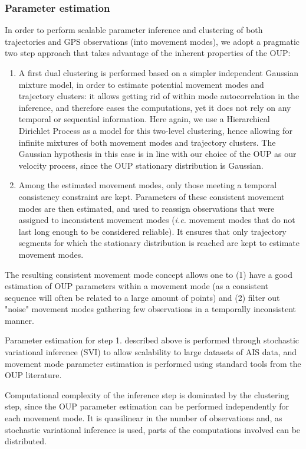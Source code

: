 \subsubsection{Parameter estimation}

In order to perform scalable parameter inference and clustering of both
trajectories and GPS observations (into movement modes), we adopt a pragmatic
two step approach that takes advantage of the inherent properties of the OUP:

\begin{enumerate}
\item A first dual clustering is performed based on a simpler independent
Gaussian mixture model, in order to estimate potential movement modes and
trajectory clusters: it allows getting rid of within mode autocorrelation in
the inference, and therefore eases the computations, yet it does not rely on any
temporal or sequential information.
Here again, we use a Hierarchical Dirichlet Process as a model for this
two-level clustering, hence allowing for infinite mixtures of both movement
modes and trajectory clusters.
The Gaussian hypothesis in this case is in line with our choice of the OUP as
our velocity process, since the OUP stationary distribution is Gaussian.
\item Among the estimated movement modes, only those meeting a temporal consistency
constraint are kept.
Parameters of these consistent movement modes are then estimated, and used to
reassign observations that were assigned to inconsistent movement modes (\emph{i.e.}
movement modes that do not last long enough to be considered reliable).
It ensures that only trajectory segments for which the stationary distribution
is reached are kept to estimate movement modes.
\end{enumerate}

The resulting consistent movement mode concept allows one to (1) have a good
estimation of OUP parameters within a movement mode (as a consistent sequence
will often be related to a large amount of points) and (2) filter out
"noise" movement modes gathering few observations in a temporally
inconsistent manner.

Parameter estimation for step 1. described above is performed through stochastic
variational inference (SVI) to allow scalability to large datasets of AIS data,
and movement mode parameter estimation is performed using standard tools from
the OUP literature.

Computational complexity of the inference step is dominated by the clustering
step, since the OUP parameter estimation can be performed independently for each
movement mode.
It is quasilinear in the number of
observations and, as stochastic variational inference is used, parts of the
computations involved can be distributed.

